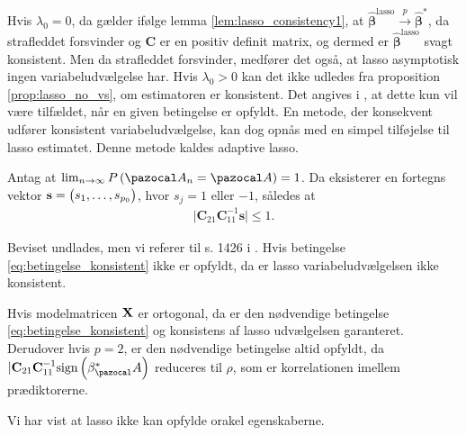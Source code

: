 Hvis $\lambda_0=0$, da gælder ifølge lemma \ref{lem:lasso_consistency1}, at $\hat{\boldsymbol{\beta}}^\text{lasso} \overset{p}{\rightarrow} \hat{\boldsymbol{\beta}}^{*}$, da strafleddet forsvinder og $\mathbf{C}$ er en positiv definit matrix, og dermed er $\hat{\boldsymbol{\beta}}^\text{lasso}$ svagt konsistent. Men da strafleddet forsvinder, medfører det også, at lasso asymptotisk ingen variabeludvælgelse har. Hvis $\lambda_0>0$ kan det ikke udledes fra proposition \ref{prop:lasso_no_vs}, om estimatoren er konsistent. Det angives i \citep{adaptive_lasso}, at dette kun vil være tilfældet, når en given betingelse er opfyldt. En metode, der konsekvent udfører konsistent variabeludvælgelse, kan dog opnås med en simpel tilføjelse til lasso estimatet. Denne metode kaldes adaptive lasso.


%

\begin{thm}
Antag at \(\lim_{n \rightarrow \infty} P \del{\A_n = \A}=1\).
Da eksisterer en fortegns vektor \(\mathbf{s} = \del{s_1, \ldots, s_{p_0}}\), hvor \(s_j=1\) eller \(-1\), således at
\begin{align}
\vert \mathbf{C}_{21} \mathbf{C}_{11}^{-1} \mathbf{s} \vert \leq 1. \label{eq:betingelse_konsistent}
\end{align}
\end{thm}
Beviset undlades, men vi referer til s. 1426 i \citep{adaptive_lasso}.
Hvis betingelse \eqref{eq:betingelse_konsistent} ikke er opfyldt, da er lasso variabeludvælgelsen ikke konsistent.

Hvis modelmatricen \(\mathbf{X}\) er ortogonal, da er den nødvendige betingelse \eqref{eq:betingelse_konsistent} og konsistens af lasso udvælgelsen garanteret.
Derudover hvis \(p=2\), er den nødvendige betingelse altid opfyldt, da \(\vert \mathbf{C}_{21} \mathbf{C}_{11}^{-1} \text{sign} \del{\beta^*_\A}\) reduceres til \(\rho\), som er korrelationen imellem prædiktorerne.

Vi har vist at lasso ikke kan opfylde orakel egenskaberne.
